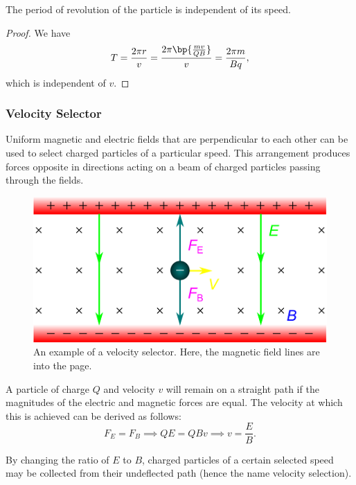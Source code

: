 \begin{corollary}
    The period of revolution of the particle is independent of its speed.
\end{corollary}
\begin{proof}
    We have \[T = \frac{2\pi r}{v} = \frac{2\pi\bp{\frac{mv}{QB}}}{v} = \frac{2\pi m}{Bq},\] which is independent of $v$.
\end{proof}

\subsubsection{Velocity Selector}

Uniform magnetic and electric fields that are perpendicular to each other can be used to select charged particles of a particular speed. This arrangement produces forces opposite in directions acting on a beam of charged particles passing through the fields.

\begin{figure}[H]
    \centering
    \includegraphics[scale=0.7]{media/Velocity Selector.png}
    \caption{An example of a velocity selector. Here, the magnetic field lines are into the page.}
\end{figure}

A particle of charge $Q$ and velocity $v$ will remain on a straight path if the magnitudes of the electric and magnetic forces are equal. The velocity at which this is achieved can be derived as follows: \[F_E = F_B \implies QE = QBv \implies v = \frac{E}{B}.\]

By changing the ratio of $E$ to $B$, charged particles of a certain selected speed may be collected from their undeflected path (hence the name velocity selection).